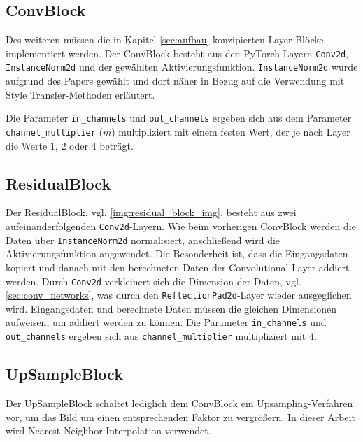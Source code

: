 \subsection{ConvBlock}

Des weiteren müssen die in Kapitel \ref{sec:aufbau} konzipierten Layer-Blöcke implementiert werden. Der ConvBlock besteht aus den PyTorch-Layern \texttt{Conv2d}, \texttt{InstanceNorm2d} und der gewählten Aktivierungsfunktion. \texttt{InstanceNorm2d} wurde aufgrund des Papers \cite{DBLP:journals/corr/UlyanovVL16} gewählt und dort näher in Bezug auf die Verwendung mit Style Transfer-Methoden erläutert.

Die Parameter \texttt{in_channels} und \texttt{out_channels} ergeben sich aus dem Parameter \texttt{channel_multiplier} ($ m $) multipliziert mit einem festen Wert, der je nach Layer die Werte $ 1 $, $ 2 $ oder $ 4 $ beträgt.

\subsection{ResidualBlock}

Der ResidualBlock, vgl. \ref{img:residual_block_img}, besteht aus zwei aufeinanderfolgenden \texttt{Conv2d}-Layern. Wie beim vorherigen ConvBlock werden die Daten über \texttt{InstanceNorm2d} normalisiert, anschließend wird die Aktivierungsfunktion angewendet. Die Besonderheit ist, dass die Eingangsdaten kopiert und danach mit den berechneten Daten der Convolutional-Layer addiert werden. Durch \texttt{Conv2d} verkleinert sich die Dimension der Daten, vgl. \ref{sec:conv_networks}, was durch den \texttt{ReflectionPad2d}-Layer wieder ausgeglichen wird. Eingangsdaten und berechnete Daten müssen die gleichen Dimensionen aufweisen, um addiert werden zu können. Die Parameter \texttt{in_channels} und \texttt{out_channels} ergeben sich aus \texttt{channel_multiplier} multipliziert mit $ 4 $.

\subsection{UpSampleBlock}

Der UpSampleBlock schaltet lediglich dem ConvBlock ein Upsampling-Verfahren vor, um das Bild um einen entsprechenden Faktor zu vergrößern. In dieser Arbeit wird Nearest Neighbor Interpolation verwendet.

